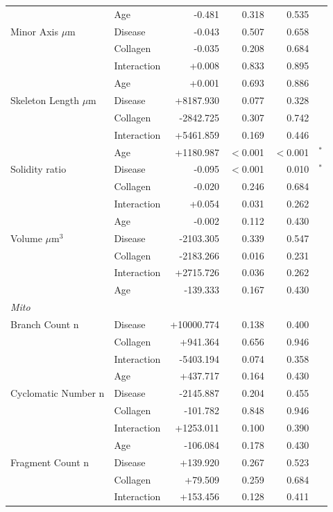 \documentclass[11pt,a4paper]{article}
\begin{document}
\begin{longtable}{llrrrr}
   & Age & -0.481 & 0.318 & 0.535 &  \\
  Minor Axis $\mu$m & Disease & -0.043 & 0.507 & 0.658 &  \\
   & Collagen & -0.035 & 0.208 & 0.684 &  \\
   & Interaction & +0.008 & 0.833 & 0.895 &  \\
   & Age & +0.001 & 0.693 & 0.886 &  \\
  Skeleton Length $\mu$m & Disease & +8187.930 & 0.077 & 0.328 &  \\
   & Collagen & -2842.725 & 0.307 & 0.742 &  \\
   & Interaction & +5461.859 & 0.169 & 0.446 &  \\
   & Age & +1180.987 & $<$0.001 & $<$0.001 & $^{*}$ \\
  Solidity ratio & Disease & -0.095 & $<$0.001 & 0.010 & $^{*}$ \\
   & Collagen & -0.020 & 0.246 & 0.684 &  \\
   & Interaction & +0.054 & 0.031 & 0.262 &  \\
   & Age & -0.002 & 0.112 & 0.430 &  \\
  Volume $\mu$m$^{3}$ & Disease & -2103.305 & 0.339 & 0.547 &  \\
   & Collagen & -2183.266 & 0.016 & 0.231 &  \\
   & Interaction & +2715.726 & 0.036 & 0.262 &  \\
   & Age & -139.333 & 0.167 & 0.430 &  \\
\midrule
\multicolumn{6}{l}{\textit{Mito}} \\
  Branch Count n & Disease & +10000.774 & 0.138 & 0.400 &  \\
   & Collagen & +941.364 & 0.656 & 0.946 &  \\
   & Interaction & -5403.194 & 0.074 & 0.358 &  \\
   & Age & +437.717 & 0.164 & 0.430 &  \\
  Cyclomatic Number n & Disease & -2145.887 & 0.204 & 0.455 &  \\
   & Collagen & -101.782 & 0.848 & 0.946 &  \\
   & Interaction & +1253.011 & 0.100 & 0.390 &  \\
   & Age & -106.084 & 0.178 & 0.430 &  \\
  Fragment Count n & Disease & +139.920 & 0.267 & 0.523 &  \\
   & Collagen & +79.509 & 0.259 & 0.684 &  \\
   & Interaction & +153.456 & 0.128 & 0.411 &  \\

\end{longtable}
\end{document}
